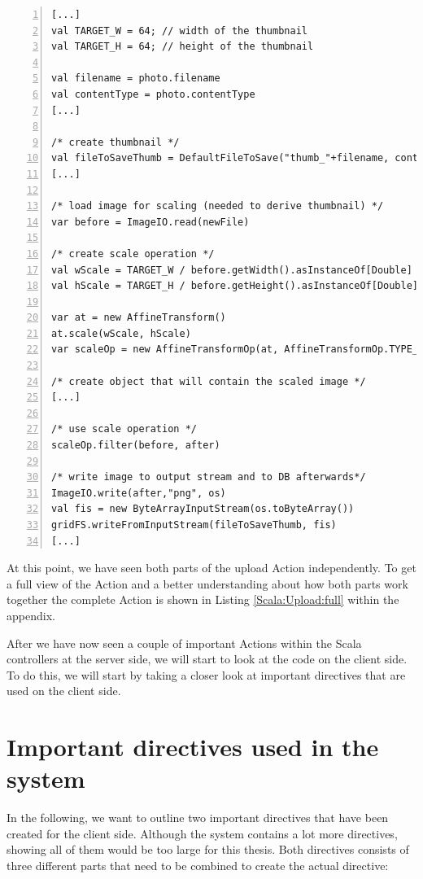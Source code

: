 \begin{lstlisting}[numbers=left,caption={Snippet of the upload Action of the FileController for creating thumbnails.},label=Scala:Upload:Thumb,frame=tlbr,breaklines]
[...]
val TARGET_W = 64; // width of the thumbnail
val TARGET_H = 64; // height of the thumbnail

val filename = photo.filename
val contentType = photo.contentType
[...]

/* create thumbnail */
val fileToSaveThumb = DefaultFileToSave("thumb_"+filename, contentType)
[...]

/* load image for scaling (needed to derive thumbnail) */
var before = ImageIO.read(newFile)

/* create scale operation */
val wScale = TARGET_W / before.getWidth().asInstanceOf[Double]
val hScale = TARGET_H / before.getHeight().asInstanceOf[Double]

var at = new AffineTransform()
at.scale(wScale, hScale)
var scaleOp = new AffineTransformOp(at, AffineTransformOp.TYPE_BILINEAR)

/* create object that will contain the scaled image */
[...]

/* use scale operation */
scaleOp.filter(before, after)

/* write image to output stream and to DB afterwards*/
ImageIO.write(after,"png", os)
val fis = new ByteArrayInputStream(os.toByteArray())
gridFS.writeFromInputStream(fileToSaveThumb, fis)
[...]
\end{lstlisting}

At this point, we have seen both parts of the upload Action independently. To get a full view of the Action and a better understanding about how both parts work together the complete Action is shown in Listing \ref{Scala:Upload:full} within the appendix.

After we have now seen a couple of important Actions within the Scala controllers at the server side, we will start to look at the code on the client side. To do this, we will start by taking a closer look at important directives that are used on the client side. 

\section{Important directives used in the system}
\label{usedDirectives}
In the following, we want to outline two important directives that have been created for the client side. Although the system contains a lot more directives, showing all of them would be too large for this thesis. Both directives consists of three different parts that need to be combined to create the actual directive:


